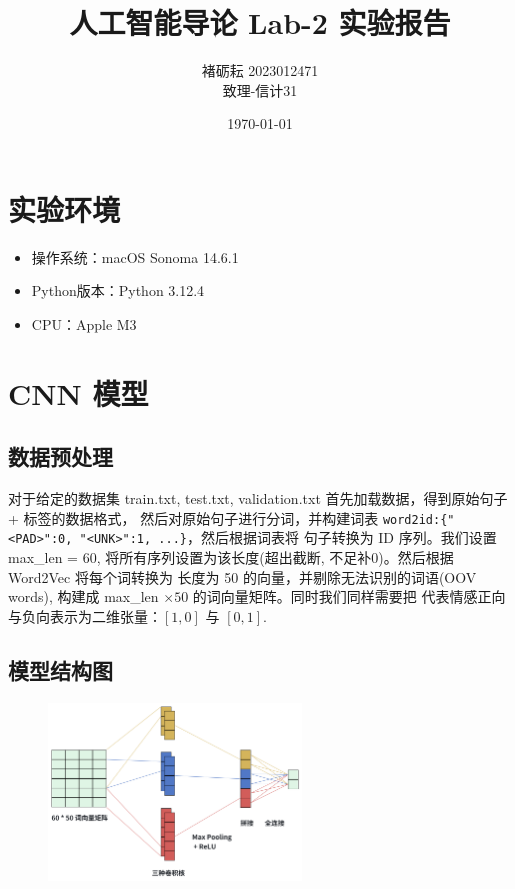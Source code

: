 \documentclass{article}
\title{{\bf 人工智能导论 Lab-2 实验报告}}
\author{褚砺耘 2023012471 \\ 致理-信计31}
\date{\today}
\begin{document}
\maketitle

\section{实验环境}

\begin{itemize}
    \item 操作系统：macOS Sonoma 14.6.1
    \item Python版本：Python 3.12.4
    \item CPU：Apple M3
\end{itemize}

\section{CNN 模型}

\subsection{数据预处理}

对于给定的数据集 train.txt, test.txt, validation.txt 首先加载数据，得到原始句子 + 标签的数据格式，
然后对原始句子进行分词，并构建词表 \texttt{word2id:\{"<PAD>":0, "<UNK>":1, ...\}}，然后根据词表将
句子转换为 ID 序列。我们设置 max\_len = 60, 将所有序列设置为该长度(超出截断, 不足补0)。然后根据 Word2Vec 将每个词转换为
长度为 50 的向量，并剔除无法识别的词语(OOV words), 构建成 max\_len $\times 50$ 的词向量矩阵。同时我们同样需要把
代表情感正向与负向表示为二维张量：$[1,0]$ 与 $[0,1]$.

\subsection{模型结构图}

\begin{figure}[h]
    \centering
    \includegraphics[width=0.6\textwidth]{img/cnn.png}
\end{figure}
\end{document}
